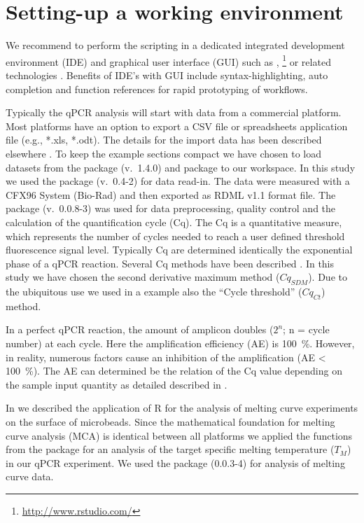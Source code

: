 \section{Setting-up a working environment}

We recommend to perform the scripting in a dedicated integrated development 
environment (IDE) and graphical user interface (GUI) such as  
\citep{rodiger_rkward_2012}, 
\footnote{\url{http://www.rstudio.com/}} or related technologies 
\citep{Valero_2012}. Benefits of IDE's with GUI include syntax-highlighting, 
auto completion and function references for rapid prototyping of workflows.

Typically the qPCR analysis will start with data from a commercial platform. 
Most platforms have an option to export a CSV file or spreadsheets application 
file (e.g., *.xls, *.odt). The details for the import data has been described 
elsewhere \citep{RDCT2010c, rodiger_rkward_2012}. To keep the example sections 
compact we have chosen to load datasets from the  package 
\citep{ritz_2008, spiess_2008} (v.~1.4.0) and  package to our 
workspace. In this study we used the  package (v.~0.4-2) for data 
read-in. The data were measured with a CFX96 System (Bio-Rad) and then exported 
as RDML v1.1 format file. The  package (v.~0.0.8-3) was used 
for data preprocessing, quality control and  the calculation of the 
quantification cycle (Cq). The Cq is a quantitative measure, which represents 
the number of cycles needed to reach a user defined threshold fluorescence 
signal level. Typically Cq are determined identically the exponential phase of a 
qPCR reaction. Several Cq methods have been described \citep{ruijter_2013}. In 
this study we have chosen the second derivative maximum method ($Cq_{SDM}$). Due to 
the ubiquitous use we used in a example also the ``Cycle threshold'' ($Cq_{Ct}$) method.

In a perfect qPCR reaction, the amount of amplicon doubles ($2^{n}$; n = cycle 
number) at each cycle. Here the amplification efficiency (AE) is 100~\%. 
However, in reality, numerous factors cause an inhibition of the amplification 
(AE < 100~\%).  The AE can determined be the relation of the Cq value depending 
on the sample input quantity as detailed described in \citep{roediger_chippcr_2014}.

In \citet{roediger_RJ_2013} we described the application of R for the analysis of 
melting curve experiments on the surface of microbeads. Since the mathematical 
foundation for melting curve analysis (MCA) is identical between all platforms 
we applied the functions from the  package 
\citep{roediger_RJ_2013} for an analysis of the target specific melting 
temperature ($T_{M}$) in our qPCR experiment. We used the  
package (0.0.3-4) for analysis of melting curve data.

